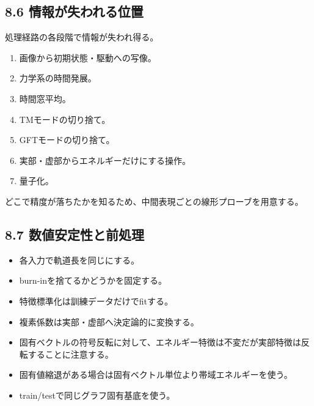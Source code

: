 \documentclass[11pt,a4paper]{ltjsarticle}
\begin{document}
\subsection*{\textcolor{researchblue}{8.6 情報が失われる位置}}

処理経路の各段階で情報が失われ得る。\par

\begin{enumerate}

\item 画像から初期状態・駆動への写像。

\item 力学系の時間発展。

\item 時間窓平均。

\item TMモードの切り捨て。

\item GFTモードの切り捨て。

\item 実部・虚部からエネルギーだけにする操作。

\item 量子化。

\end{enumerate}

どこで精度が落ちたかを知るため、中間表現ごとの線形プローブを用意する。\par

\subsection*{\textcolor{researchblue}{8.7 数値安定性と前処理}}

\begin{itemize}

\item 各入力で軌道長を同じにする。

\item burn-inを捨てるかどうかを固定する。

\item 特徴標準化は訓練データだけでfitする。

\item 複素係数は実部・虚部へ決定論的に変換する。

\item 固有ベクトルの符号反転に対して、エネルギー特徴は不変だが実部特徴は反転することに注意する。

\item 固有値縮退がある場合は固有ベクトル単位より帯域エネルギーを使う。

\item train/testで同じグラフ固有基底を使う。

\end{itemize}
\end{document}
